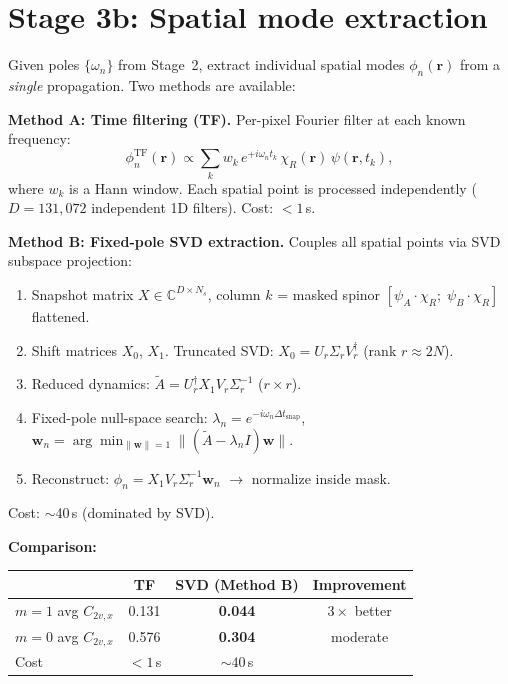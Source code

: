 \documentclass[11pt,a4paper]{article}
\newcommand{\vb}[1]{\mathbf{#1}}
\begin{document}
\section*{Stage 3b: Spatial mode extraction}

Given poles $\{\omega_n\}$ from Stage~2, extract individual
spatial modes $\phi_n(\vb{r})$ from a \emph{single} propagation.
Two methods are available:

\medskip
\noindent\textbf{Method A: Time filtering (TF).}\quad
Per-pixel Fourier filter at each known frequency:
\begin{equation*}
  \phi_n^\text{TF}(\vb{r}) \propto \sum_k w_k \, e^{+i\omega_n t_k}
  \, \chi_R(\vb{r}) \, \psi(\vb{r}, t_k),
\end{equation*}
where $w_k$ is a Hann window.
Each spatial point is processed independently ($D = 131{,}072$
independent 1D filters). Cost: $< 1$\,s.

\medskip
\noindent\textbf{Method B: Fixed-pole SVD extraction.}\quad
Couples all spatial points via SVD subspace projection:
\begin{enumerate}[nosep,leftmargin=1.5em]
  \item Snapshot matrix $X \in \mathbb{C}^{D \times N_s}$, column $k$ =
        masked spinor $[\psi_A \cdot \chi_R;\; \psi_B \cdot \chi_R]$
        flattened.
  \item Shift matrices $X_0$, $X_1$. Truncated SVD:
        $X_0 = U_r \Sigma_r V_r^\dagger$ (rank $r \approx 2N$).
  \item Reduced dynamics:
        $\tilde{A} = U_r^\dagger X_1 V_r \Sigma_r^{-1}$
        \quad ($r \times r$).
  \item Fixed-pole null-space search:
        $\lambda_n = e^{-i\omega_n \Delta t_\text{snap}}$, \;
        $\vb{w}_n = \arg\min_{\|\vb{w}\|=1}
        \|(\tilde{A} - \lambda_n I)\vb{w}\|$.
  \item Reconstruct:
        $\phi_n = X_1 V_r \Sigma_r^{-1} \vb{w}_n$
        $\to$ normalize inside mask.
\end{enumerate}
Cost: $\sim$40\,s (dominated by SVD).

\medskip
\noindent\textbf{Comparison:}

\begin{center}
\begin{tabular}{lccc}
\toprule
& TF & SVD (Method B) & Improvement \\
\midrule
$m=1$ avg $C_{2v,x}$ & 0.131 & \textbf{0.044} & $3\times$ better \\
$m=0$ avg $C_{2v,x}$ & 0.576 & \textbf{0.304} & moderate \\
Cost & $< 1$\,s & $\sim 40$\,s & \\
\bottomrule
\end{tabular}
\end{center}
\end{document}
